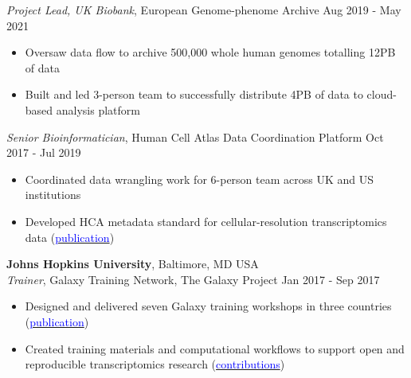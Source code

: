 \documentclass[margin,line]{res}
\begin{document}
\begin{resume}
{\em Project Lead, UK Biobank}, European Genome-phenome Archive \hfill {Aug 2019 - May 2021}
\begin{itemize}
\itemsep0em 
	\item Oversaw data flow to archive 500,000 whole human genomes totalling 12PB of data
	\item Built and led 3-person team to successfully distribute 4PB of data to cloud-based analysis platform
\end{itemize}

{\em Senior Bioinformatician}, Human Cell Atlas Data Coordination Platform \hfill {Oct 2017 - Jul 2019}
\begin{itemize}
\itemsep0em 
	\item Coordinated data wrangling work for 6-person team across UK and US institutions
	\item Developed HCA metadata standard for cellular-resolution transcriptomics data (\href{https://doi.org/10.1038/s41587-020-00744-z}{\textcolor{blue}{publication}})
\end{itemize}


{\bf Johns Hopkins University}, Baltimore, MD USA\\
{\em Trainer}, Galaxy Training Network, The Galaxy Project \hfill {Jan 2017 - Sep 2017}
\begin{itemize}
\itemsep0em 
	\item Designed and delivered seven Galaxy training workshops in three countries (\href{https://doi.org/10.1016/j.cels.2018.05.012}{\textcolor{blue}{publication}})
	\item Created training materials and computational workflows to support open and reproducible transcriptomics research (\href{https://training.galaxyproject.org/training-material/hall-of-fame/malloryfreeberg/}{\textcolor{blue}{contributions}})
\end{itemize}


\end{resume}
\end{document}
